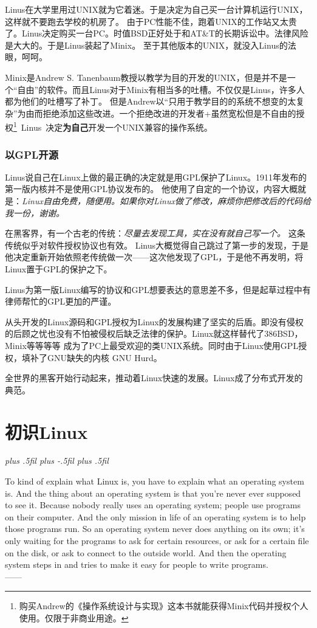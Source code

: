 \documentclass[amstex,twoside]{ctexbook}
\newcommand{\RTLpar}{%
  \leftskip=0pt plus .5fil%
  \rightskip=0pt plus -.5fil%
  \parfillskip=0pt plus .5fil%
}
\newenvironment{quotes}[2][0.55]{\pushQED{#2}%
\begin{flushright}%
\begin{minipage}{#1\textwidth}\begin{flushright}\noindent\it\RTLpar}{%
 \\------\popQED{}\end{flushright}\end{minipage}\end{flushright}\vskip 8mm }%
\begin{document}
Linus在大学里用过UNIX就为它着迷。于是决定为自己买一台计算机运行UNIX，这样就不要跑去学校的机房了。
由于PC性能不佳，跑着UNIX的工作站又太贵了。Linus决定购买一台PC。时值BSD正好处于和AT\&T的长期诉讼中。法律风险是大大的。于是Linus装起了Minix。
至于其他版本的UNIX，就没入Linus的法眼，呵呵。

Minix是Andrew S. Tanenbaum教授以教学为目的开发的UNIX，但是并不是一个“自由”的软件。而且Linus对于Minix有相当多的吐槽。不仅仅是Linus，许多人都为他们的吐槽写了补丁。
但是Andrew以“只用于教学目的的系统不想变的太复杂”为由而拒绝添加这些改进。一个拒绝改进的开发者+虽然宽松但是不自由的授权\footnote{
购买Andrew的《操作系统设计与实现》这本书就能获得Minix代码并授权个人使用。仅限于非商业用途。}\textrightarrow ~Linus~决定\textbf{为自己}开发一个UNIX兼容的操作系统。


\subsection{以GPL开源}

Linus说自己在Linux上做的最正确的决定就是用GPL保护了Linux。1911年发布的第一版内核并不是使用GPL协议发布的。
他使用了自定的一个协议，内容大概就是：{\it Linux自由免费，随便用。如果你对Linux做了修改，麻烦你把修改后的代码给我一份，谢谢。}

在黑客界，有一个古老的传统：\emph{尽量去发现工具，实在没有就自己写一个。} 这条传统似乎对软件授权协议也有效。
%
Linus大概觉得自己跳过了第一步的发现，于是他决定重新开始依照老传统做一次——这次他发现了GPL，于是他不再发明，将Linux置于GPL的保护之下。

Linus为第一版Linux编写的协议和GPL想要表达的意思差不多，但是起草过程中有律师帮忙的GPL更加的严谨。

从头开发的Linux源码和GPL授权为Linux的发展构建了坚实的后盾。即没有侵权的后顾之忧也没有不怕被侵权后缺乏法律的保护。Linux就这样替代了386BSD，Minix等等等等
成为了PC上最受欢迎的类UNIX系统。同时由于Linux使用GPL授权，填补了GNU缺失的内核 GNU Hurd。

全世界的黑客开始行动起来，推动着Linux快速的发展。Linux成了分布式开发的典范。

\chapter{初识Linux}

\begin{quotes}[0.63]{Linus~Torvalds}
To kind of explain what Linux is, you have to explain what an operating system is. And the thing about an operating system is that you're never ever supposed to see it. Because nobody really uses an operating system; people use programs on their computer. And the only mission in life of an operating system is to help those programs run. So an operating system never does anything on its own; it's only waiting for the programs to ask for certain resources, or ask for a certain file on the disk, or ask to connect to the outside world. And then the operating system steps in and tries to make it easy for people to write programs.
\end{quotes}
\end{document}
